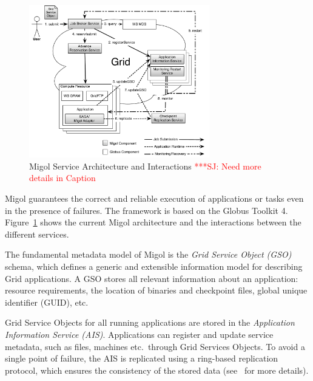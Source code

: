 \documentclass[times, 10pt,twocolumn]{article}
\newcommand{\jhanote}[1]{ {\textcolor{red} { ***SJ: #1 }}}
\begin{document}
\begin{figure}[t]
            \centering
                \includegraphics[width=0.7\textwidth]{migol_architecture}
            \caption{Migol Service Architecture and Interactions \jhanote{Need more details in  Caption} }
            \label{fig:migol_architecture} 
\end{figure}           


Migol guarantees the correct and reliable exe\-cution of applications or tasks even in
the presence of  failures. The framework is based on the Globus Toolkit 4. 
Figure~\ref{fig:migol_architecture} shows the current Migol architecture and 
the interactions between the different services.

The fundamental metadata model of Migol is the \emph{Grid Service Object (GSO)} schema,
which defines a generic and extensible information model for
describing Grid applications.  
A GSO stores all relevant information about an application: resource requirements,
the location of binaries and checkpoint files, global unique identifier (GUID),
etc.

Grid Service Objects for all running applications are stored in 
the {\em Application Information Service (AIS)}. 
Applications can register and update service metadata, 
such as files, machines etc.\ through Grid Services Objects. 
To avoid a single point of failure, the AIS is replicated using a ring-based
replication protocol, which ensures  the consistency of the stored data
(see~\cite{Luckow:2008ys} for more details).
\end{document}
